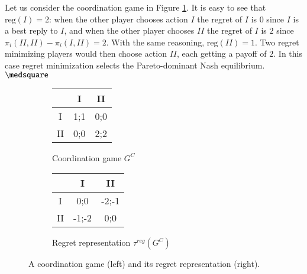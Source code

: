 \documentclass[fleqn,reqno,11pt]{article}
\begin{document}
\begin{example}
  Let us consider the coordination game in Figure \ref{coordgame1}. It is easy to see that
  $\text{reg}(I)=2$: when the other player chooses action $I$ the regret of $I$ is $0$ since
  $I$ is a best reply to $I$, and when the other player chooses $II$ the regret of $I$ is $2$
  since $\pi_i(II,II)-\pi_i(I,II)=2$. With the same reasoning, $\text{reg}(II)=1$. Two regret
  minimizing players would then choose action $II$, each getting a payoff of $2$. In this case
  regret minimization selects the Pareto-dominant Nash equilibrium. $ \medsquare $

\begin{figure}

  \begin{subfigure}[b]{0.4\textwidth}
    \centering
    \begin{tabular}{ccc}
      \toprule
      & I & II \\
      \midrule
      I & 1;1 & 0;0 \\
      \hline 
      II & 0;0 & 2;2\\
      \bottomrule
    \end{tabular}
    \caption{Coordination game $G^C$}
    \label{coordgame1}
  \end{subfigure}
  \hfill
  \begin{subfigure}[b]{0.4\textwidth}
    \centering
    \begin{tabular}{ccc}
      \toprule
      & I & II \\
      \midrule
      I & 0;0 & -2;-1 \\
      \hline 
      II & -1;-2 & 0;0\\
      \bottomrule
    \end{tabular}
    \caption{Regret representation $\tau^{reg}(G^C)$}
    \label{coordgame1reg}
  \end{subfigure}
  \caption{A coordination game (left) and its regret representation (right).}
    \label{coordgame1mainFig}
\end{figure}



\end{example}
\end{document}
